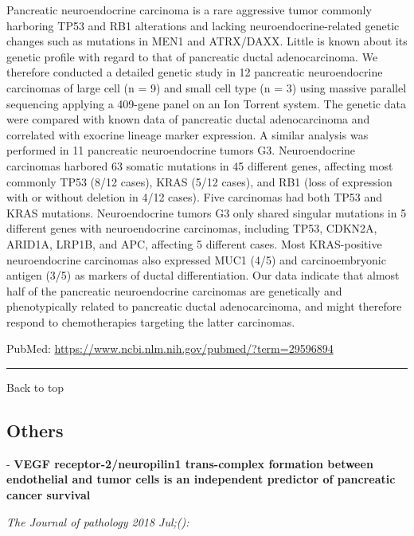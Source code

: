 \documentclass[]{article}
\begin{document}
Pancreatic neuroendocrine carcinoma is a rare aggressive tumor commonly
harboring TP53 and RB1 alterations and lacking neuroendocrine-related
genetic changes such as mutations in MEN1 and ATRX/DAXX. Little is known
about its genetic profile with regard to that of pancreatic ductal
adenocarcinoma. We therefore conducted a detailed genetic study in 12
pancreatic neuroendocrine carcinomas of large cell (n = 9) and small
cell type (n = 3) using massive parallel sequencing applying a 409-gene
panel on an Ion Torrent system. The genetic data were compared with
known data of pancreatic ductal adenocarcinoma and correlated with
exocrine lineage marker expression. A similar analysis was performed in
11 pancreatic neuroendocrine tumors G3. Neuroendocrine carcinomas
harbored 63 somatic mutations in 45 different genes, affecting most
commonly TP53 (8/12 cases), KRAS (5/12 cases), and RB1 (loss of
expression with or without deletion in 4/12 cases). Five carcinomas had
both TP53 and KRAS mutations. Neuroendocrine tumors G3 only shared
singular mutations in 5 different genes with neuroendocrine carcinomas,
including TP53, CDKN2A, ARID1A, LRP1B, and APC, affecting 5 different
cases. Most KRAS-positive neuroendocrine carcinomas also expressed MUC1
(4/5) and carcinoembryonic antigen (3/5) as markers of ductal
differentiation. Our data indicate that almost half of the pancreatic
neuroendocrine carcinomas are genetically and phenotypically related to
pancreatic ductal adenocarcinoma, and might therefore respond to
chemotherapies targeting the latter carcinomas.

PubMed: \url{https://www.ncbi.nlm.nih.gov/pubmed/?term=29596894}

{}

{}

\begin{center}\rule{0.5\linewidth}{\linethickness}\end{center}

Back to top

\pagebreak

\hypertarget{others}{%
\subsection{Others}\label{others}}

 - \textbf{VEGF receptor-2/neuropilin1 trans-complex formation between
endothelial and tumor cells is an independent predictor of pancreatic
cancer survival}

\emph{The Journal of pathology 2018 Jul;():}
\end{document}
